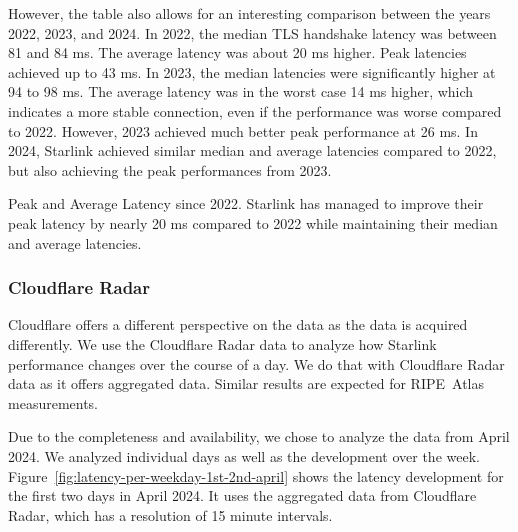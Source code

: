 However, the table also allows for an interesting comparison between the years
2022, 2023, and 2024. In 2022, the median TLS handshake latency was between 81
and 84 ms. The average latency was about 20 ms higher. Peak latencies achieved
up to 43 ms. In 2023, the median latencies were significantly higher at 94 to
98 ms. The average latency was in the worst case 14 ms higher, which indicates
a more stable connection, even if the performance was worse compared to 2022.
However, 2023 achieved much better peak performance at 26 ms. In 2024, Starlink
achieved similar median and average latencies compared to 2022, but also
achieving the peak performances from 2023.

\begin{takeaway}{Peak and Average Latency since 2022.}
	Starlink has managed to improve their peak latency by nearly 20 ms
	compared to 2022 while maintaining their median and average latencies.
\end{takeaway}

\subsubsection*{Cloudflare Radar}

Cloudflare offers a different perspective on the data as the data is acquired
differently. We use the Cloudflare Radar data to analyze how Starlink
performance changes over the course of a day. We do that with Cloudflare Radar
data as it offers aggregated data. Similar results are expected for RIPE~Atlas
measurements.

Due to the completeness and availability, we chose to analyze the data from
April 2024. We analyzed individual days as well as the development over the
week. Figure~\ref{fig:latency-per-weekday-1st-2nd-april} shows the latency
development for the first two days in April 2024. It uses the aggregated data
from Cloudflare Radar, which has a resolution of 15 minute intervals.


